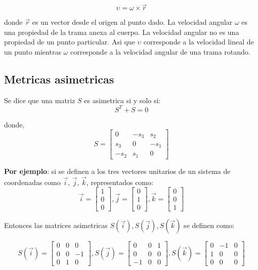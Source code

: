 \documentclass[10pt,a4paper]{article}
\begin{document}
$$ \upsilon = \omega \times \vec{r}$$

donde $\vec{r}$ es un vector desde el origen al punto dado. La velocidad angular $\omega$ es una propiedad de la trama anexa al cuerpo. La velocidad angular no es una propiedad de un punto particular. Asi que $\upsilon$ corresponde a la velocidad lineal de un punto mientras $\omega$ corresponde a la velocidad angular de una trama rotando.

\subsection{Metricas asimetricas}
Se dice que una matriz $S$ es asimetrica si y solo si:
$$ S^T + S = 0$$

donde,
\begin{equation}
	S =
	\begin{bmatrix}
		0    & -s_3 & s_2\\
		s_3  & 0    & -s_1\\
		-s_2 & s_1  & 0
	\end{bmatrix}
\end{equation}

\textbf{Por ejemplo}: si se definen a los tres vectores unitarios de un sistema de coordenadas como $\vec{i}$, $\vec{j}$, $\vec{k}$, representados como:
\begin{equation}
	\vec{i} =
	\begin{bmatrix}
		1 \\ 0 \\ 0
	\end{bmatrix},
	\vec{j} =
	\begin{bmatrix}
		0 \\ 1 \\ 0
	\end{bmatrix},
	\vec{k} =
	\begin{bmatrix}
		0 \\ 0 \\ 1
	\end{bmatrix}
\end{equation}

Entonces las matrices asimetricas $S(\vec{i}), S(\vec{j}), S(\vec{k})$ se definen como:

\begin{equation}
	S(\vec{i}) =
	\begin{bmatrix}
		0 & 0 & 0 \\
		0 & 0 & -1\\
		0 & 1 & 0
	\end{bmatrix},
	S(\vec{j}) =
	\begin{bmatrix}
		0 & 0 & 1 \\
		0 & 0 & 0\\
		-1& 0 & 0
	\end{bmatrix},
	S(\vec{k}) =
	\begin{bmatrix}
		0 & -1 & 0 \\
		1 & 0 & 0\\
		0 & 0 & 0
	\end{bmatrix}
\end{equation}
\end{document}
